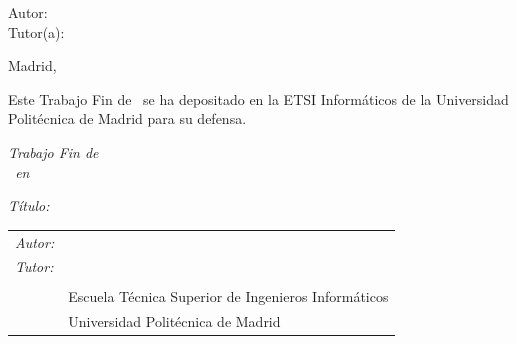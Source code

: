 \begin{titlepage}
\vspace*{0.5cm}
\begin{center}
\huge\bfseries {\TituloTFG}
\end{center}

\vspace*{5cm}

\noindent
\large{Autor: \NombreAutor{} }\\
\large{Tutor(a): \NombreTutor{} }

\vspace*{3cm}
\begin{center}
Madrid, \Fecha
\end{center}

\clearpage

\thispagestyle{empty}
\noindent
Este Trabajo Fin de \Estudios\ se ha depositado en la ETSI Informáticos de la Universidad Politécnica de Madrid para su defensa.

\vspace*{4cm}

\noindent
\textit{Trabajo Fin de \Estudios}\\
\textit{\Estudios\ en \TituloEstudios}

\begin{minipage}[t]{0.1\linewidth}
  \textit{Título:}
\end{minipage}
\begin{minipage}[t]{0.88\linewidth}
  \TituloTFG
\end{minipage}

\Fecha

\vspace*{4cm}

\noindent
\begin{tabular}{ll}
  \textit{Autor:} & \NombreAutor{}  \\
  \textit{Tutor:} & \NombreTutor{}  \\
                  & \Departamento{} \\
                  & Escuela Técnica Superior de Ingenieros Informáticos\\
                  & Universidad Politécnica de Madrid
\end{tabular}
\end{titlepage}
